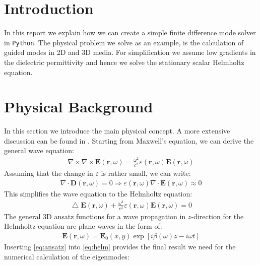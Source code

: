 \documentclass[a4paper,12pt]{scrartcl}
\title{\titel}
\author{\Large{Steev \textsc{Mathew}, Felix \textsc{Wechsler}, Yaqi \textsc{Zhang}}\\  \large{Group 3}}
\date{\large{\today}}
\newcommand\ff[1]{ \mathbf #1(\mathbf r, \omega)}
\newcommand\lap{\mathop{{}\bigtriangleup}\nolimits}
\begin{document}
    \maketitle
	\thispagestyle{empty}
	\newpage
	\tableofcontents

\newpage
\section{Introduction}
    In this report we explain how we can create a simple finite difference mode
    solver in \texttt{Python}.
    The physical problem we solve as an example, is the calculation
    of guided modes in 2D and 3D media. 
    For simplification we assume low gradients in the dielectric permittivity and hence we solve the stationary scalar Helmholtz equation.

\section{Physical Background}
    In this section we introduce the main physical concept. A more extensive discussion can be found in \cite{lecture}.
    Starting from Maxwell's equation, we can derive the general wave equation:
    \begin{align}
        \nabla \times \nabla \times \mathbf E(\mathbf r, \omega) = \frac{\omega^2}{c^2} \varepsilon(\mathbf r, \omega) \mathbf E(\mathbf r, \omega)
        \label{eq:wave}
    \end{align}
    Assuming that the change in $\varepsilon$ is rather small, we can write:
    \begin{align}
        \nabla \cdot \ff D = 0 \Rightarrow \varepsilon(\mathbf r, \omega) \nabla \cdot \ff E \approx 0
    \end{align}
    This simplifies the wave equation to the Helmholtz equation:
    \begin{align}
        \lap \ff E + \frac{\omega^2}{c^2} \varepsilon(\mathbf r, \omega) \ff E = 0
        \label{eq:helm}
    \end{align}
    The general 3D ansatz functions for a wave propagation in $z$-direction for the Helmholtz equation are plane waves in the form of:
    \begin{align}
        \ff E = \mathbf E_0(x, y) \exp\left[i \beta(\omega) z - i \omega t\right]
        \label{eq:ansatz}
    \end{align}
    Inserting \autoref{eq:ansatz} into \autoref{eq:helm} provides the final result we need for the numerical calculation of the eigenmodes:
\end{document}
